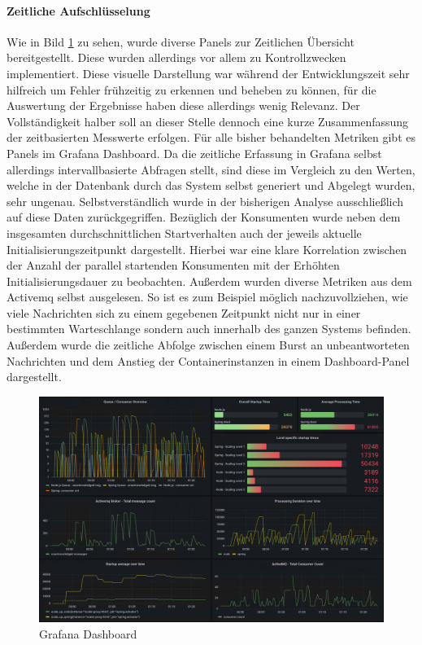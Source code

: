 \paragraph{Zeitliche Aufschlüsselung}
Wie in Bild \ref{fig:grafanaScreenshot01} zu sehen, wurde diverse Panels zur Zeitlichen Übersicht bereitgestellt. Diese wurden allerdings vor allem zu Kontrollzwecken implementiert. Diese visuelle Darstellung war während der Entwicklungszeit sehr hilfreich um Fehler frühzeitig zu erkennen und beheben zu können, für die Auswertung der Ergebnisse haben diese allerdings wenig Relevanz. Der Vollständigkeit halber soll an dieser Stelle dennoch eine kurze Zusammenfassung der zeitbasierten Messwerte erfolgen. Für alle bisher behandelten Metriken gibt es Panels im Grafana Dashboard. Da die zeitliche Erfassung in Grafana selbst allerdings intervallbasierte Abfragen stellt, sind diese im Vergleich zu den Werten, welche in der Datenbank durch das System selbst generiert und Abgelegt wurden, sehr ungenau. Selbstverständlich wurde in der bisherigen Analyse ausschließlich auf diese Daten zurückgegriffen. Bezüglich der Konsumenten wurde neben dem insgesamten durchschnittlichen Startverhalten auch der jeweils aktuelle Initialisierungszeitpunkt dargestellt. Hierbei war eine klare Korrelation zwischen der Anzahl der parallel startenden Konsumenten mit der Erhöhten Initialisierungsdauer zu beobachten. Außerdem wurden diverse Metriken aus dem Activemq selbst ausgelesen. So ist es zum Beispiel möglich nachzuvollziehen, wie viele Nachrichten sich zu einem gegebenen Zeitpunkt nicht nur in einer bestimmten Warteschlange sondern auch innerhalb des ganzen Systems befinden. Außerdem wurde die zeitliche Abfolge zwischen einem Burst an unbeantworteten Nachrichten und dem Anstieg der Containerinstanzen in einem Dashboard-Panel dargestellt.

\begin{figure}[ht!]
	\centering
	\includegraphics[width=\linewidth]{kapitel/problemloesung/implementierung/_img/grafana-dashboard-01}
	\caption[]{Grafana Dashboard}
	\label{fig:grafanaScreenshot01}
\end{figure}



